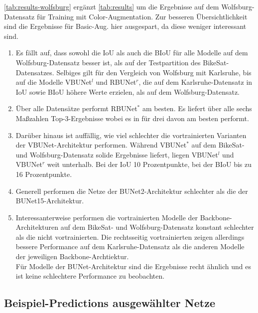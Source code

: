 \autoref{tab:results-wolfsburg} ergänzt \autoref{tab:results} um die Ergebnisse auf dem Wolfsburg-Datensatz für 
Training mit Color-Augmentation. Zur besseren Übersichtlichkeit sind die Ergebnisse für Basic-Aug. hier ausgespart, 
da diese weniger interessant sind. 
\begin{enumerate}
	\item Es fällt auf, dass sowohl die \ac{IoU} als auch die \ac{BIoU} für alle Modelle
	auf dem Wolfsburg-Datensatz besser ist, als auf der Testpartition des BikeSat-Datensatzes.  
	Selbiges gilt für den Vergleich von Wolfsburg mit Karlsruhe, bis auf die Modelle VBUNet$^l$ und 
	RBUNet$^r$, die auf dem Karlsruhe-Datensatz in IoU sowie BIoU höhere Werte erzielen, als auf dem Wolfsburg-Datensatz.
	\item Über alle Datensätze performt RBUNet$^*$ am besten. Es liefert über alle sechs Maßzahlen Top-3-Ergebnisse wobei es 
	in für drei davon am besten performt. 
	\item Darüber hinaus ist auffällig, wie viel schlechter die vortrainierten Varianten der VBUNet-Architektur performen. 
	Während VBUNet$^*$ auf dem BikeSat- und Wolfsburg-Datensatz solide Ergebnisse liefert, liegen VBUNet$^l$ und VBUNet$^r$ 
	weit unterhalb. Bei der IoU 10 Prozentpunkte, bei der BIoU bis zu 16 Prozentpunkte.
	\item Generell performen die Netze der \ac{BUNet2}-Architektur schlechter als die der \ac{BUNet15}-Architektur.
	\item Interessanterweise performen die vortrainierten Modelle der Backbone-Architekturen auf dem BikeSat- und 
	Wolfsburg-Datensatz konstant schlechter als die nicht vortrainierten. Die rechtsseitig vortrainierten zeigen 
	allerdings bessere Performance auf dem Karlsruhe-Datensatz als die anderen Modelle der jeweiligen Backbone-Archtiektur.\\
	Für Modelle der BUNet-Architektur sind die Ergebnisse recht ähnlich und es ist keine schlechtere Performance
	zu beobachten. 
\end{enumerate}


\subsection{Beispiel-Predictions ausgewählter Netze}

